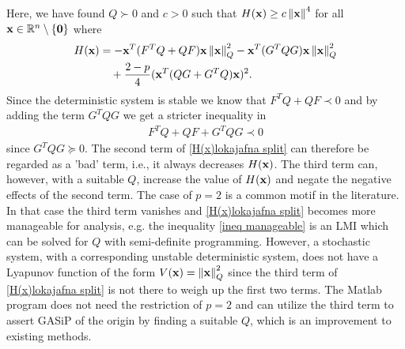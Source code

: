 \documentclass[a4paper,12pt,twoside,BCOR=10mm]{scrbook}
\begin{document}
Here, we have found $Q \succ 0$ and $c > 0$ such that $H(\mathbf{x}) \geq c\left\lVert\mathbf{x}\right\rVert^4$ for all $\mathbf{x} \in \mathbb{R}^{n}\setminus\{\mathbf{0}\}$ where
\begin{align}\label{H(x)lokajafna split}
\begin{split}
    H(\mathbf{x}) &= -\mathbf{x}^T (F^T Q + QF )\mathbf{x}\left\lVert\mathbf{x}\right\rVert_{Q}^{2} -\mathbf{x}^T(G^TQG) \mathbf{x}\left\lVert\mathbf{x}\right\rVert_{Q}^{2}\\
    &\quad+ \frac{2 - p}{4} (\mathbf{x}^T (QG + G^TQ)\mathbf{x})^2.
\end{split}
\end{align}
Since the deterministic system is stable we know that $F^TQ + QF \prec 0$ and by adding the term $G^T QG$ we get a stricter inequality in
\begin{align}\label{ineq manageable}
    F^T Q + QF + G^T Q G \prec 0
\end{align}
since $G^T Q G \succeq 0$. The second term of \eqref{H(x)lokajafna split} can therefore be regarded as a 'bad' term, i.e., it always decreases $H(\mathbf{x})$. The third term can, however, with a suitable $Q$, increase the value of $H(\mathbf{x})$ and negate the negative effects of the second term. The case of $p = 2$ is a common motif in the literature. In that case the third term vanishes and \eqref{H(x)lokajafna split} becomes more manageable for analysis, e.g. the inequality \eqref{ineq manageable} is an LMI which can be solved for $Q$ with semi-definite programming. However, a stochastic system, with a corresponding unstable deterministic system, does not have a Lyapunov function of the form $V(\mathbf{x}) = \left\lVert\mathbf{x}\right\rVert_{Q}^{2}$ since the third term of \eqref{H(x)lokajafna split} is not there to weigh up the first two terms. The Matlab program does not need the restriction of $p = 2$ and can utilize the third term to assert GASiP of the origin by finding a suitable $Q$, which is an improvement to existing methods.
\end{document}
